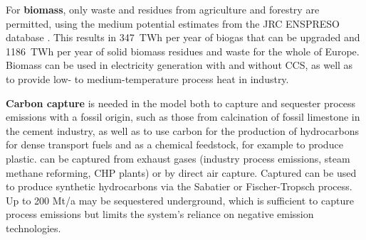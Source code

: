 For \textbf{biomass}, only waste and residues from agriculture and forestry are
permitted, using the medium potential estimates from the JRC ENSPRESO database
\cite{ruizENSPRESOOpen2019}. This results in 347~TWh per year of biogas that can be
upgraded and 1186~TWh per year of solid biomass residues and waste
for the whole of Europe. Biomass can be used in electricity generation with and
without CCS, as well as to provide low- to medium-temperature process heat in
industry.

\textbf{Carbon capture} is needed in the model both to capture and sequester
process emissions with a fossil origin, such as those from calcination of fossil
limestone in the cement industry, as well as to use carbon for the production of
hydrocarbons for dense transport fuels and as a chemical feedstock, for example
to produce plastic. \co can be captured from exhaust gases (industry process
emissions, steam methane reforming, CHP plants) or by direct air capture.
Captured \co can be used to produce synthetic hydrocarbons via the Sabatier or
Fischer-Tropsch process. Up to 200 Mt\co/a may be sequestered underground, which
is sufficient to capture process emissions but limits the system's reliance on
negative emission technologies.
